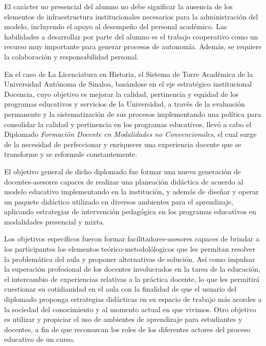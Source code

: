 El carácter no presencial del alumno no debe significar la ausencia de los
elementos de infraestructura institucionales necesarios para la
administración del modelo, incluyendo el apoyo al desempeño del personal
académico. Las habilidades a desarrollar por parte del alumno es el trabajo
cooperativo como un recurso muy  importante para generar procesos de
autonomía. Además, se  requiere la colaboración y responsabilidad personal.

En el caso de La Licenciatura en Historia, el Sistema de Torre Académica de
la Universidad Autónoma de Sinaloa, basándose en el eje estratégico
institucional Docencia, cuyo objetivo es mejorar la calidad, pertinencia y
equidad de los programas educativos y servicios de la Universidad, a través
de la evaluación permanente y la sistematización de sus procesos
implementando una política para consolidar la calidad y pertinencia en los
programas educativos, llevó a cabo el Diplomado \textit{Formación Docente
en Modalidades no Convencionales}, el cual surge de la necesidad de
perfeccionar y enriquecer una experiencia docente que se transforme y
se reformule constantemente.

El objetivo general de dicho diplomado fue formar una nueva generación de
docentes-asesores capaces de realizar una planeación didáctica de acuerdo
al modelo educativo implementando en la institución, y además de diseñar y
operar un paquete didáctico utilizado en diversos ambientes para el
aprendizaje, aplicando estrategias de intervención pedagógica en los
programas educativos en modalidades presencial y mixta.

\enlargethispage{1\baselineskip}
Los objetivos específicos fueron formar facilitadores-asesores capaces de
brindar a los participantes los elementos teórico-metodolólogicos que les
permitan resolver la problemática del aula y proponer alternativas de
solución. Así como impulsar la superación profesional de los docentes
involucrados en la tarea de la educación, el intercambio de experiencias
relativas a la práctica docente, lo que les permitirá cuestionar su
cotidianidad en el aula con la finalidad de que el usuario del diplomado
proponga estrategias didácticas en su espacio de trabajo más acordes a la
sociedad del conocimiento y al momento actual en que vivimos. Otro objetivo
es utilizar y propiciar el uso de ambientes de aprendizaje para
estudiantes y docentes, a fin de que reconozcan los roles de los diferentes
actores del proceso educativo de un curso.

